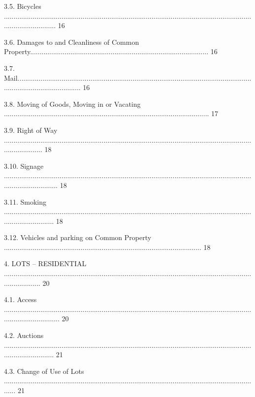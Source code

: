 \documentclass{article}
\begin{document}
{\fontsize{9.99}{1}3.5. Bicycles ............................................................................................................................................................ 16 }

{\fontsize{9.99}{1}3.6. Damages to and Cleanliness of Common Property............................................................................................. 16 }

{\fontsize{9.99}{1}3.7. Mail.................................................................................................................................................................. 16 }

{\fontsize{9.99}{1}3.8. Moving of Goods, Moving in or Vacating ........................................................................................................... 17 }

{\fontsize{9.99}{1}3.9. Right of Way ..................................................................................................................................................... 18 }

{\fontsize{9.99}{1}3.10. Signage ............................................................................................................................................................. 18 }

{\fontsize{9.99}{1}3.11. Smoking ........................................................................................................................................................... 18 }

{\fontsize{9.99}{1}3.12. Vehicles and parking on Common Property ....................................................................................................... 18 }

{\fontsize{9.99}{1}4. LOTS – RESIDENTIAL .................................................................................................................................................... 20 }

{\fontsize{9.99}{1}4.1. Access .............................................................................................................................................................. 20 }

{\fontsize{9.99}{1}4.2. Auctions ........................................................................................................................................................... 21 }

{\fontsize{9.99}{1}4.3. Change of Use of Lots ....................................................................................................................................... 21 }
\end{document}
